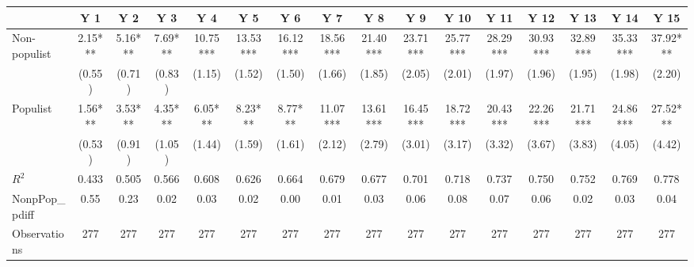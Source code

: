 {
\def\sym#1{\ifmmode^{#1}\else\(^{#1}\)\fi}
\begin{tabular}{l*{15}{c}}
\hline\hline
                &\multicolumn{1}{c}{Y 1}&\multicolumn{1}{c}{Y 2}&\multicolumn{1}{c}{Y 3}&\multicolumn{1}{c}{Y 4}&\multicolumn{1}{c}{Y 5}&\multicolumn{1}{c}{Y 6}&\multicolumn{1}{c}{Y 7}&\multicolumn{1}{c}{Y 8}&\multicolumn{1}{c}{Y 9}&\multicolumn{1}{c}{Y 10}&\multicolumn{1}{c}{Y 11}&\multicolumn{1}{c}{Y 12}&\multicolumn{1}{c}{Y 13}&\multicolumn{1}{c}{Y 14}&\multicolumn{1}{c}{Y 15}\\
\hline
Non-populist    &     2.15***&     5.16***&     7.69***&    10.75***&    13.53***&    16.12***&    18.56***&    21.40***&    23.71***&    25.77***&    28.29***&    30.93***&    32.89***&    35.33***&    37.92***\\
                &   (0.55)   &   (0.71)   &   (0.83)   &   (1.15)   &   (1.52)   &   (1.50)   &   (1.66)   &   (1.85)   &   (2.05)   &   (2.01)   &   (1.97)   &   (1.96)   &   (1.95)   &   (1.98)   &   (2.20)   \\
[1em]
Populist        &     1.56***&     3.53***&     4.35***&     6.05***&     8.23***&     8.77***&    11.07***&    13.61***&    16.45***&    18.72***&    20.43***&    22.26***&    21.71***&    24.86***&    27.52***\\
                &   (0.53)   &   (0.91)   &   (1.05)   &   (1.44)   &   (1.59)   &   (1.61)   &   (2.12)   &   (2.79)   &   (3.01)   &   (3.17)   &   (3.32)   &   (3.67)   &   (3.83)   &   (4.05)   &   (4.42)   \\
\hline
\(R^{2}\)       &    0.433   &    0.505   &    0.566   &    0.608   &    0.626   &    0.664   &    0.679   &    0.677   &    0.701   &    0.718   &    0.737   &    0.750   &    0.752   &    0.769   &    0.778   \\
NonpPop\_pdiff   &     0.55   &     0.23   &     0.02   &     0.03   &     0.02   &     0.00   &     0.01   &     0.03   &     0.06   &     0.08   &     0.07   &     0.06   &     0.02   &     0.03   &     0.04   \\
Observations    &      277   &      277   &      277   &      277   &      277   &      277   &      277   &      277   &      277   &      277   &      277   &      277   &      277   &      277   &      277   \\
\hline\hline
\end{tabular}
}
